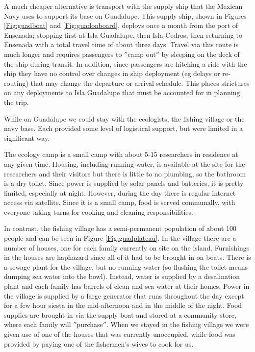 A much cheaper alternative is transport with the supply ship that the Mexican Navy uses to support its base on Guadalupe. This supply ship, shown in Figures \ref{Fig:guadboat} and \ref{Fig:guadonboard}, deploys once a month from the port of Ensenada; stopping first at Isla Guadalupe, then Isla Cedros, then returning to Ensenada with a total travel time of about three days. Travel via this route is much longer and requires passengers to $''$camp out$''$ by sleeping on the deck of the ship during transit. In addition, since passengers are hitching a ride with the ship they have no control over changes in ship deployment (eg delays or re-routing) that may change the departure or arrival schedule. This places strictures on any deployments to Isla Guadalupe that must be accounted for in planning the trip. 

While on Guadalupe we could stay with the ecologists, the fishing village or the navy base. Each provided some level of logistical support, but were limited in a significant way. 

The ecology camp is a small camp with about 5-15 researchers in residence at any given time. Housing, including running water, is available at the site for the researchers and their visitors but there is little to no plumbing, so the bathroom is a dry toilet.  Since power is supplied by solar panels and batteries, it is pretty limited, especially at night. However, during the day there is regular internet access via satellite. Since it is a small camp, food is served communally, with everyone taking turns for cooking and cleaning responsibilities. 

In contrast, the fishing village has a semi-permanent population of about 100 people and can be seen in Figure \ref{Fig:guadplateau}. In the village there are a number of houses, one for each family currently on site on the island. Furnishings in the houses are haphazard since all of it had to be brought in on boats. There is a sewage plant for the village, but no running water (so flushing the toilet means dumping sea water into the bowl). Instead, water is supplied by a desalination plant and each family has barrels of clean and sea water at their homes. Power in the village is supplied by a large generator that runs throughout the day except for a few hour siesta in the mid-afternoon and in the middle of the night. Food supplies are brought in via the supply boat and stored at a community store, where each family will $''$purchase$''$. When we stayed in the fishing village we were given use of one of the houses that was currently unoccupied, while food was provided by paying one of the fishermen's wives to cook for us. 

